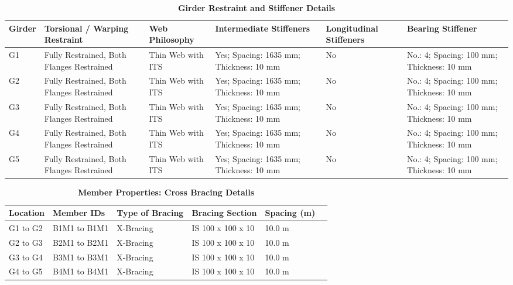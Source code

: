 \documentclass[12pt,a4paper]{report}
\numberwithin{table}{chapter}
\numberwithin{figure}{chapter}
\begin{document}
\vspace{4pt}
\begin{longtable}{|L{1.4cm}|p{2.2cm}|p{2.2cm}|p{3.0cm}|p{2.4cm}|p{2.2cm}|}
\caption{\textbf{Girder Restraint and Stiffener Details}}\\
\hline
\textbf{Girder} & \textbf{Torsional / Warping Restraint} & \textbf{Web Philosophy} & \textbf{Intermediate Stiffeners} & \textbf{Longitudinal Stiffeners} & \textbf{Bearing Stiffener} \\[6pt]
\hline
\endfirsthead
\endhead

G1 & Fully Restrained, Both Flanges Restrained & Thin Web with ITS & Yes; Spacing: 1635 mm; Thickness: 10 mm & No & No.: 4; Spacing: 100 mm; Thickness: 10 mm \\[8pt]
\hline
G2 & Fully Restrained, Both Flanges Restrained & Thin Web with ITS & Yes; Spacing: 1635 mm; Thickness: 10 mm & No & No.: 4; Spacing: 100 mm; Thickness: 10 mm \\[8pt]
\hline
G3 & Fully Restrained, Both Flanges Restrained & Thin Web with ITS & Yes; Spacing: 1635 mm; Thickness: 10 mm & No & No.: 4; Spacing: 100 mm; Thickness: 10 mm \\[8pt]
\hline
G4 & Fully Restrained, Both Flanges Restrained & Thin Web with ITS & Yes; Spacing: 1635 mm; Thickness: 10 mm & No & No.: 4; Spacing: 100 mm; Thickness: 10 mm \\[8pt]
\hline
G5 & Fully Restrained, Both Flanges Restrained & Thin Web with ITS & Yes; Spacing: 1635 mm; Thickness: 10 mm & No & No.: 4; Spacing: 100 mm; Thickness: 10 mm \\[8pt]
\hline
\end{longtable}



\newpage

\vspace{0.4em}
\setlength{\tabcolsep}{4pt}
\setlength\LTleft{0pt}
\setlength\LTright{\fill}

\begin{longtable}{|L{2.2cm}|L{2.2cm}|L{3.0cm}|L{2.5cm}|C{1.8cm}|C{1.8cm}|}
\caption{\textbf{Member Properties: Cross Bracing Details}}
\hline
\textbf{Location} & \textbf{Member IDs} & \textbf{Type of Bracing} & \textbf{Bracing Section} & \textbf{Spacing (m)} \\
\hline
G1 to G2 & B1M1 to B1M1 & X-Bracing & IS 100 x 100 x 10 & 10.0 m \\[6pt]
\hline
G2 to G3 & B2M1 to B2M1 & X-Bracing & IS 100 x 100 x 10 & 10.0 m \\[6pt]
\hline
G3 to G4 & B3M1 to B3M1 & X-Bracing & IS 100 x 100 x 10 & 10.0 m \\[6pt]
\hline
G4 to G5 & B4M1 to B4M1 & X-Bracing & IS 100 x 100 x 10 & 10.0 m \\[6pt]
\hline
\end{longtable}
\end{document}
